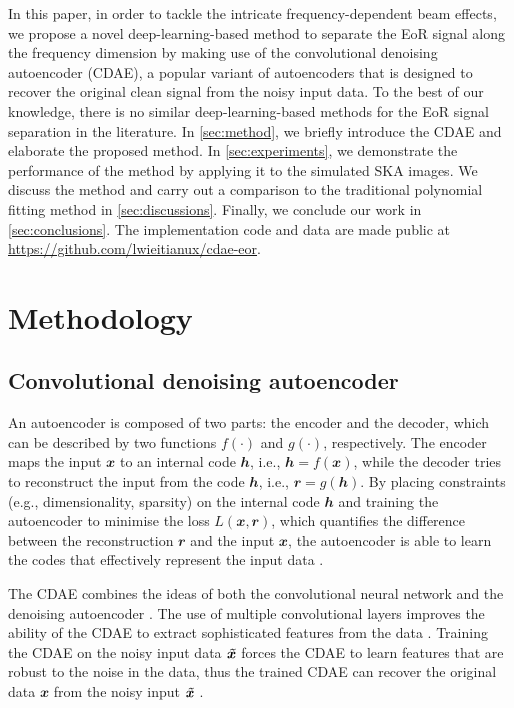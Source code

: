 \documentclass[letters,a4paper,fleqn,usenatbib]{mnras}
\newcommand{\B}[1]{\mathbfit{#1}}
\begin{document}
In this paper, in order to tackle the intricate frequency-dependent
beam effects, we propose a novel deep-learning-based method to separate
the EoR signal along the frequency dimension by making use of the
convolutional denoising autoencoder (CDAE), a popular variant of
autoencoders that is designed to recover the original clean signal
from the noisy input data.
To the best of our knowledge, there is no similar deep-learning-based
methods for the EoR signal separation in the literature.
In \autoref{sec:method}, we briefly introduce the CDAE and elaborate
the proposed method.
In \autoref{sec:experiments}, we demonstrate the performance of the
method by applying it to the simulated SKA images.
We discuss the method and carry out a comparison to the traditional
polynomial fitting method in \autoref{sec:discussions}.
Finally, we conclude our work in \autoref{sec:conclusions}.
The implementation code and data are made public at
\url{https://github.com/lwieitianux/cdae-eor}.


\section{Methodology}
\label{sec:method}

\subsection{Convolutional denoising autoencoder}
\label{sec:cdae}

An autoencoder is composed of two parts: the encoder and the decoder,
which can be described by two functions $f(\cdot)$ and $g(\cdot)$,
respectively.
The encoder maps the input $\B{x}$ to an internal code $\B{h}$, i.e.,
$\B{h} = f(\B{x})$, while the decoder tries to reconstruct the input
from the code $\B{h}$, i.e., $\B{r} = g(\B{h})$.
By placing constraints (e.g., dimensionality, sparsity) on the
internal code $\B{h}$ and training the autoencoder to minimise the
loss $L(\B{x}, \B{r})$, which quantifies the difference between the
reconstruction $\B{r}$ and the input $\B{x}$, the autoencoder is able
to learn the codes that effectively represent the input data
\citep[chapter 14]{goodfellow2016}.

The CDAE combines the ideas of both the convolutional neural network
and the denoising autoencoder \citep{du2017}.
The use of multiple convolutional layers improves the ability of the
CDAE to extract sophisticated features from the data \citep{masci2011}.
Training the CDAE on the noisy input data $\B{\~{x}}$ forces the CDAE
to learn features that are robust to the noise in the data, thus the
trained CDAE can recover the original data $\B{x}$ from the noisy
input $\B{\~{x}}$ \citep{vincent2008,vincent2010}.
\end{document}
